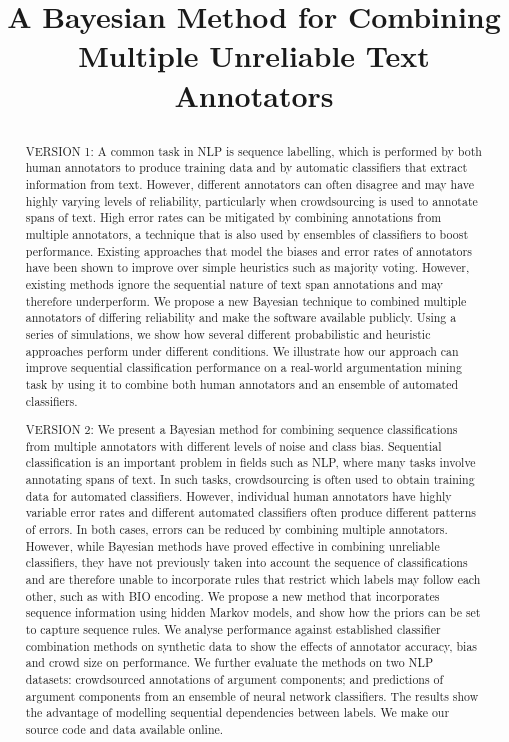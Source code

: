\documentclass[conference]{IEEEtran}
\title{ 
A Bayesian Method for Combining Multiple Unreliable Text Annotators

}
\author{\IEEEauthorblockN{Anonymous}
\IEEEauthorblockA{Anonymous, \\
Anonymous \\
Email: anonymous}
\and
\IEEEauthorblockN{Anonymous}
\IEEEauthorblockA{Anonymous, \\
Anonymous \\
Email: anonymous}
\and
\IEEEauthorblockN{Anonymous}
\IEEEauthorblockA{Anonymous, \\
Anonymous \\
Email: anonymous}
}
\begin{document}
\maketitle

\begin{abstract}
VERSION 1:
A common task in NLP is sequence labelling, which is performed by both human annotators to 
produce training data and by automatic classifiers that extract information from text.
However, different annotators can often disagree and may have highly varying levels of reliability,
particularly when crowdsourcing is used to annotate spans of text. 
High error rates can be mitigated by combining annotations from multiple annotators,
a technique that is also used by ensembles of classifiers to boost performance.
Existing approaches that model the biases and error rates of annotators have been shown to 
improve over simple heuristics such as majority voting. However, existing methods
ignore the sequential nature of text span annotations and may therefore underperform.
We propose a new Bayesian technique to combined multiple annotators of differing reliability 
and make the software available publicly. 
Using a series of simulations, we show how several different probabilistic
and heuristic approaches perform under different conditions. 
We illustrate how our approach can improve sequential classification performance on a 
real-world argumentation mining task by using it to combine both human annotators and 
an ensemble of automated classifiers.

VERSION 2:
We present a Bayesian method for combining sequence classifications from multiple annotators with different levels of noise and class bias. Sequential classification is an important problem in fields such as NLP, where many tasks involve annotating spans of text. 
In such tasks, crowdsourcing is often used to obtain training data for automated classifiers. However, individual human annotators have highly variable error rates and different automated classifiers often produce different patterns of errors. In both cases, errors can be reduced by combining multiple annotators.
However, while Bayesian methods have proved effective in combining unreliable classifiers, they have not previously taken into account the sequence of classifications and are therefore unable to incorporate rules that restrict which labels may follow each other, such as with BIO encoding. We propose a new method that incorporates sequence information using hidden Markov models, and show how the priors can be set to capture sequence rules. We analyse performance against established classifier combination methods on synthetic data to show the effects of annotator accuracy, bias and crowd size on performance. We further evaluate the methods on two NLP datasets: crowdsourced annotations of argument components; and predictions of argument components from an ensemble of neural network classifiers. The results show the advantage of modelling sequential dependencies between labels. We make our source code and data available online.


\end{abstract}
\end{document}
